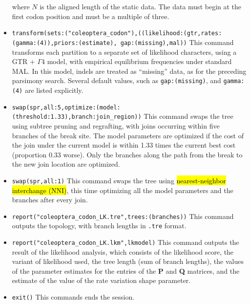 \begin{itemize}
where $N$ is the aligned length of the static data. The data must begin at the first codon position and must be a multiple
of three.
\item \texttt{transform(sets:("coleoptera\_codon"),((likelihood:(gtr,rates:\\(gamma:(4)),priors:(estimate), gap:(missing),mal))} 
This command transforms each partition to a separate set of likelihood characters, using a GTR + $\Gamma 4$ model, with empirical 
equilibrium frequencies under standard MAL. In this model, indels are treated as ``missing'' data, as for the 
preceding parsimony search. Several default values, such as \texttt{gap:(missing)}, and \texttt{gamma:(4)} are 
listed explicitly. 
\item \texttt{swap(spr,all:5,optimize:(model:(threshold:1.33),branch:join\_region))} This command swaps the tree using 
subtree pruning and regrafting, with joins occurring within five branches of the break site. The model parameters are
optimized if the cost of the join under the current model is within 1.33 times the current best cost (proportion 0.33 worse). 
Only the branches along the path from the break to the new join location are optimized. 
\item \texttt{swap(spr,all:1)} This command swaps the tree using \hl{nearest-neighbor interchange (NNI)}, this time
optimizing all the model parameters and the branches after every join.
\item \texttt{report("coleoptera\_codon\_LK.tre",trees:(branches))} This command outputs the topology, with branch lengths in 
\texttt{.tre} format.
\item \texttt{report("coleoptera\_codon\_LK.lkm",lkmodel)} This command outputs the result of the likelihood analysis, which 
consists of the likelihood score, the variant of likelihood used, the tree length (sum of branch lengths), the values 
of the parameter estimates for the entries of the \textbf{P} and \textbf{Q} matrices, and the estimate of the value of 
the rate variation shape parameter.
\item \texttt{exit()} This commands ends the \poy session.
\end{itemize}

